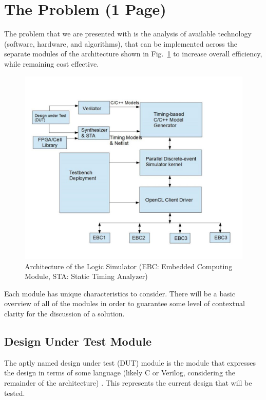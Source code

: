 \documentclass[conference]{IEEEtran}
\begin{document}
\section{The Problem (1 Page)}
The problem that we are presented with is the analysis of available technology (software, hardware, and algorithms), that can be implemented across the separate modules of the architecture shown in Fig.~\ref{arch} to increase overall efficiency, while remaining cost effective. 

\begin{figure}[htbp]
\centerline{\includegraphics[width=\linewidth]{./images/architecture.png}}
\caption{Architecture of the Logic Simulator (EBC: Embedded Computing Module, STA: Static Timing Analyzer)}
\label{arch}
\end{figure}

Each module has unique characteristics to consider. There will be a basic overview of all of the modules in order to guarantee some level of contextual clarity for the discussion of a solution. 

\subsection{Design Under Test Module}
The aptly named design under test (DUT) module is the module that expresses the design in terms of some language (likely C or Verilog, considering the remainder of the architecture) \cite{b3} . This represents the current design that will be tested. 
\end{document}
